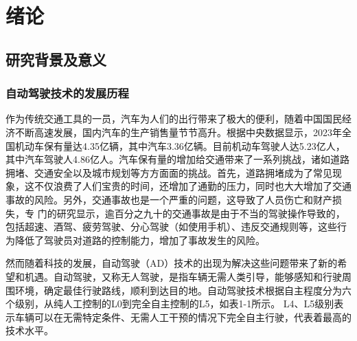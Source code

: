 \chapter{绪论}



\section{研究背景及意义}

\subsection{自动驾驶技术的发展历程}

作为传统交通工具的一员，汽车为人们的出行带来了极大的便利，随着中国国民经济不断高速发展，国内汽车的生产销售量节节高升。根据中央数据显示，2023年全国机动车保有量达4.35亿辆，其中汽车3.36亿辆。目前机动车驾驶人达5.23亿人，其中汽车驾驶人4.86亿人。汽车保有量的增加给交通带来了一系列挑战，诸如道路拥堵、交通安全以及城市规划等方方面面的挑战。首先，道路拥堵成为了常见现象，这不仅浪费了人们宝贵的时间，还增加了通勤的压力，同时也大大增加了交通事故的风险。另外，交通事故也是一个严重的问题，这导致了人员伤亡和财产损失，专
门的研究显示，逾百分之九十的交通事故是由于不当的驾驶操作导致的，包括超速、酒驾、疲劳驾驶、分心驾驶（如使用手机）、违反交通规则等，这些行为降低了驾驶员对道路的控制能力\cite{关鑫2023自动驾驶安全挑战}，增加了事故发生的风险。

然而随着科技的发展，自动驾驶（AD）技术的出现为解决这些问题带来了新的希望和机遇。自动驾驶，又称无人驾驶，是指车辆无需人类引导，能够感知和行驶周围环境，确定最佳行驶路线，顺利到达目的地。自动驾驶技术根据自主程度分为六个级别，从纯人工控制的L0到完全自主控制的L5，如表1-1所示。 L4、L5级别表示车辆可以在无需特定条件、无需人工干预的情况下完全自主行驶，代表着最高的技术水平\cite{1023549446.nh}。



